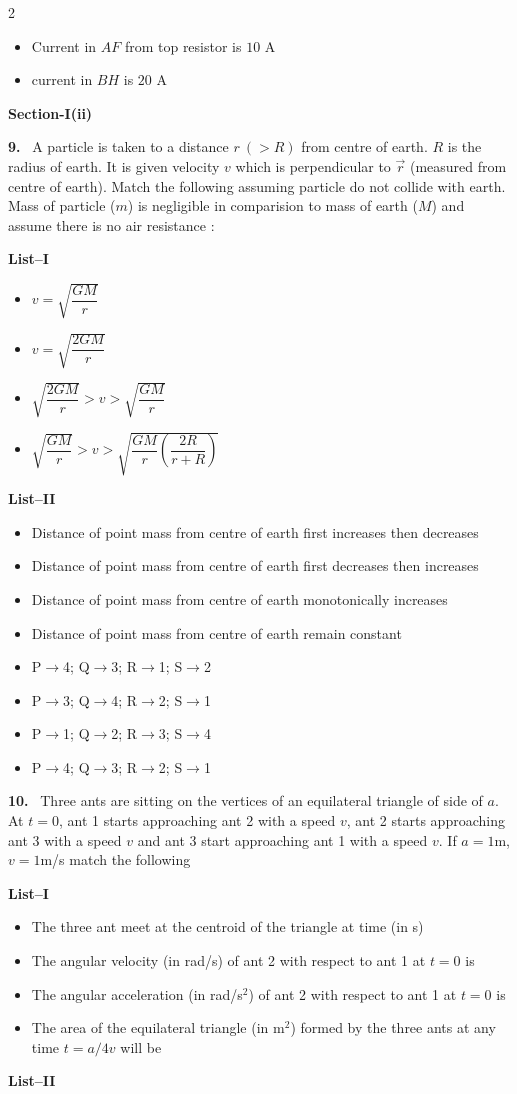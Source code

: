 \documentclass[10pt]{extarticle}
\newcommand{\sect}[1]{\par\smallskip\noindent\textbf{#1}\par}
\newcommand{\qn}[1]{\par\smallskip\noindent\textbf{#1.}~}
\newenvironment{qoptions}{\begin{itemize}[leftmargin=1.8em,itemsep=1pt,topsep=2pt,label={}]}{\end{itemize}}
\newcommand{\opt}[2]{\item[(#1)] #2}
\begin{document}
\begin{multicols}{2}
\begin{qoptions}
\opt{C}{Current in $AF$ from top resistor is $10$ A}
\opt{D}{current in $BH$ is $20$ A}
\end{qoptions}
\sect{Section-I(ii)}
\qn{9} A particle is taken to a distance $r\ (>R)$ from centre of earth. $R$ is the radius of earth. It is given velocity $v$ which is perpendicular to $\vec r$ (measured from centre of earth). Match the following assuming particle do not collide with earth. Mass of particle ($m$) is negligible in comparision to mass of earth ($M$) and assume there is no air resistance :
\par\noindent\textbf{List--I}
\begin{qoptions}
\opt{P}{$v=\sqrt{\dfrac{GM}{r}}$}
\opt{Q}{$v=\sqrt{\dfrac{2GM}{r}}$}
\opt{R}{$\sqrt{\dfrac{2GM}{r}}>v>\sqrt{\dfrac{GM}{r}}$}
\opt{S}{$\sqrt{\dfrac{GM}{r}}>v>\sqrt{\dfrac{GM}{r}\left(\dfrac{2R}{r+R}\right)}$}
\end{qoptions}
\par\noindent\textbf{List--II}
\begin{qoptions}
\opt{1}{Distance of point mass from centre of earth first increases then decreases}
\opt{2}{Distance of point mass from centre of earth first decreases then increases}
\opt{3}{Distance of point mass from centre of earth monotonically increases}
\opt{4}{Distance of point mass from centre of earth remain constant}
\end{qoptions}
\begin{qoptions}
\opt{A}{P$\to$4; Q$\to$3; R$\to$1; S$\to$2}
\opt{B}{P$\to$3; Q$\to$4; R$\to$2; S$\to$1}
\opt{C}{P$\to$1; Q$\to$2; R$\to$3; S$\to$4}
\opt{D}{P$\to$4; Q$\to$3; R$\to$2; S$\to$1}
\end{qoptions}
\qn{10} Three ants are sitting on the vertices of an equilateral triangle of side of $a$. At $t=0$, ant 1 starts approaching ant 2 with a speed $v$, ant 2 starts approaching ant 3 with a speed $v$ and ant 3 start approaching ant 1 with a speed $v$. If $a=1$m, $v=1$m/s match the following
\par\noindent\textbf{List--I}
\begin{qoptions}
\opt{P}{The three ant meet at the centroid of the triangle at time (in s)}
\opt{Q}{The angular velocity (in rad/s) of ant 2 with respect to ant 1 at $t=0$ is}
\opt{R}{The angular acceleration (in rad/s$^2$) of ant 2 with respect to ant 1 at $t=0$ is}
\opt{S}{The area of the equilateral triangle (in m$^2$) formed by the three ants at any time $t=a/4v$ will be}
\end{qoptions}
\par\noindent\textbf{List--II}

\end{multicols}
\end{document}
